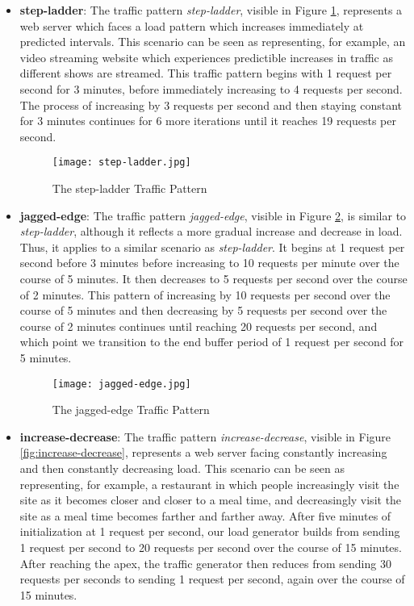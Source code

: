 \begin{itemize}
  \item \textbf{step-ladder}: The traffic pattern \textit{step-ladder}, visible
    in Figure \ref{fig:step-ladder}, represents a web server which faces a load
    pattern which increases immediately at predicted intervals. This scenario
    can be seen as representing, for example, an video streaming website which
    experiences predictible increases in traffic as different shows are
    streamed. This traffic pattern begins with 1 request per second for 3
    minutes, before immediately increasing to 4 requests per second. The process
    of increasing by 3 requests per second and then staying constant for 3
    minutes continues for 6 more iterations until it reaches 19 requests per
    second.

    \begin{figure}[!h]
      \centerline{\texttt{[image: step-ladder.jpg]}}
      \caption{The step-ladder Traffic Pattern}
      \label{fig:step-ladder}
    \end{figure}

  \item \textbf{jagged-edge}: The traffic pattern \textit{jagged-edge}, visible
    in Figure \ref{fig:jagged-edge}, is similar to \textit{step-ladder},
    although it reflects a more gradual increase and decrease in load. Thus, it
    applies to a similar scenario as \textit{step-ladder}. It begins at 1
    request per second before 3 minutes before increasing to 10 requests per
    minute over the course of 5 minutes. It then decreases to 5 requests per
    second over the course of 2 minutes. This pattern of increasing by 10
    requests per second over the course of 5 minutes and then decreasing by 5
    requests per second over the course of 2 minutes continues until reaching 20
    requests per second, and which point we transition to the end buffer period
    of 1 request per second for 5 minutes.

    \begin{figure}[!h]
      \centerline{\texttt{[image: jagged-edge.jpg]}}
      \caption{The jagged-edge Traffic Pattern}
      \label{fig:jagged-edge}
    \end{figure}

  \item \textbf{increase-decrease}: The traffic pattern
    \textit{increase-decrease}, visible in Figure \ref{fig:increase-decrease},
    represents a web server facing constantly increasing and then constantly
    decreasing load. This scenario can be seen as representing, for example, a
    restaurant in which people increasingly visit the site as it becomes closer
    and closer to a meal time, and decreasingly visit the site as a meal time
    becomes farther and farther away. After five minutes of initialization at
    1 request per second, our load
    generator builds from sending 1 request per second to 20 requests per
    second over the course of 15 minutes. After reaching the apex, the traffic
    generator then reduces from sending 30 requests per seconds to sending 1
    request per second, again over the course of 15 minutes.


\end{itemize}
